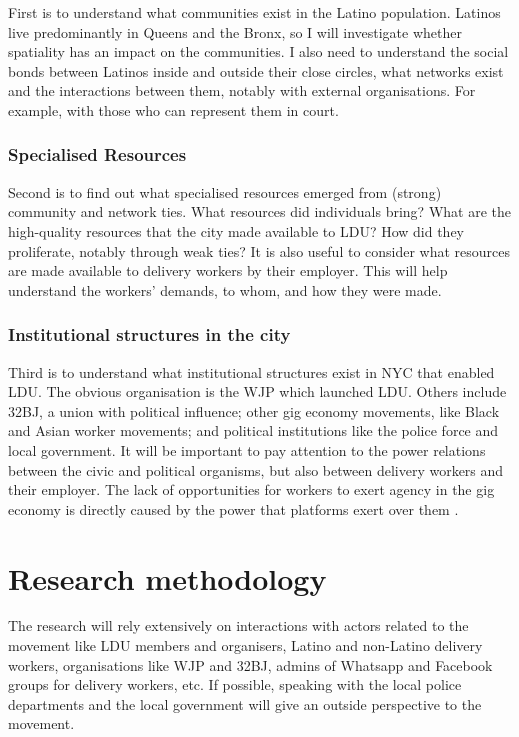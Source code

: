 \documentclass{article}
\begin{document}
First is to understand what communities exist in the Latino population. Latinos live predominantly in Queens and the Bronx, so I will investigate whether spatiality has an impact on the communities. I also need to understand the social bonds between Latinos inside and outside their close circles, what networks exist and the interactions between them, notably with external organisations. For example, with those who can represent them in court.

\subsubsection{Specialised Resources}

Second is to find out what specialised resources emerged from (strong) community and network ties. What resources did individuals bring? What are the high-quality resources that the city made available to LDU? How did they proliferate, notably through weak ties?
It is also useful to consider what resources are made available to delivery workers by their employer. This will help understand the workers' demands, to whom, and how they were made.

\subsubsection{Institutional structures in the city}

Third is to understand what institutional structures exist in NYC that enabled LDU. The obvious organisation is the WJP which launched LDU. Others include 32BJ, a union with political influence; other gig economy movements, like Black and Asian worker movements; and political institutions like the police force and local government. It will be important to pay attention to the power relations between the civic and political organisms, but also between delivery workers and their employer.
The lack of opportunities for workers to exert agency in the gig economy is directly caused by the power that platforms exert over them \parencite{anwar2020hidden}.

\section{Research methodology}

The research will rely extensively on interactions with actors related to the movement like LDU members and organisers, Latino and non-Latino delivery workers, organisations like WJP and 32BJ, admins of Whatsapp and Facebook groups for delivery workers, etc. If possible, speaking with the local police departments and the local government will give an outside perspective to the movement.
\end{document}
